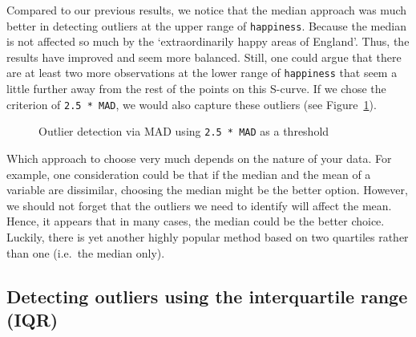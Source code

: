 \documentclass[
  letterpaper,
]{krantz}
\begin{document}
Compared to our previous results, we notice that the median approach was
much better in detecting outliers at the upper range of
\texttt{happiness}. Because the median is not affected so much by the
`extraordinarily happy areas of England'. Thus, the results have
improved and seem more balanced. Still, one could argue that there are
at least two more observations at the lower range of \texttt{happiness}
that seem a little further away from the rest of the points on this
S-curve. If we chose the criterion of \texttt{2.5\ *\ MAD}, we would
also capture these outliers (see
Figure~\ref{fig-MAD2-outlier-detection}).

\begin{figure}


\caption{\label{fig-MAD2-outlier-detection}Outlier detection via MAD
using \texttt{2.5\ *\ MAD} as a threshold}

\end{figure}%

Which approach to choose very much depends on the nature of your data.
For example, one consideration could be that if the median and the mean
of a variable are dissimilar, choosing the median might be the better
option. However, we should not forget that the outliers we need to
identify will affect the mean. Hence, it appears that in many cases, the
median could be the better choice. Luckily, there is yet another highly
popular method based on two quartiles rather than one (i.e.~the median
only).

\subsection{Detecting outliers using the interquartile range
(IQR)}\label{sec-outliers-iqr}
\end{document}
